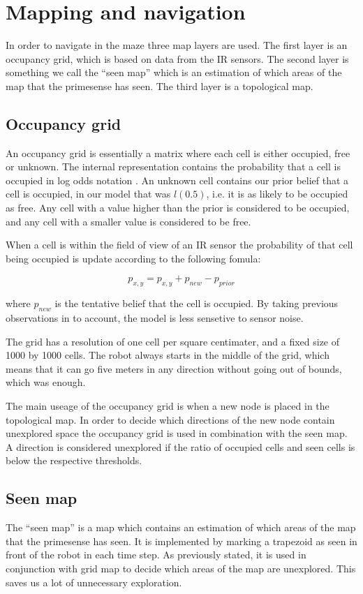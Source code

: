 \section{Mapping and navigation}
In order to navigate in the maze three map layers are used. The first layer is an occupancy grid, which is based on data from the IR sensors. The second layer is something we call the ``seen map'' which is an estimation of which areas of the map that the primesense has seen. The third layer is a topological map.

\subsection{Occupancy grid}
An occupancy grid is essentially a matrix where each cell is either occupied, free or unknown. 
The internal representation contains the probability that a cell is occupied in log odds notation \cite{wiki:Logit}.
An unknown cell contains our prior belief that a cell is occupied, in our model that was $l(0.5)$, i.e. it is as likely to be occupied as free. 
Any cell with a value higher than the prior is considered to be occupied, and any cell with a smaller value is considered to be free.

When a cell is within the field of view of an IR sensor the probability of that cell being occupied is update according to the following fomula:

\begin{equation}
p_{x, y} = p_{x, y} + p_{new} - p_{prior}
\end{equation}

where $p_{new}$ is the tentative belief that the cell is occupied. By taking previous observations in to account, the model is less sensetive to sensor noise. \cite{GridLecture}

The grid has a resolution of one cell per square centimater, and a fixed size of 1000 by 1000 cells. 
The robot always starts in the middle of the grid, which means that it can go five meters in any direction without going out of bounds, which was enough.

The main useage of the occupancy grid is when a new node is placed in the topological map. 
In order to decide which directions of the new node contain unexplored space the occupancy grid is used in combination with the seen map. 
A direction is considered unexplored if the ratio of occupied cells and seen cells is below the respective thresholds.

\subsection{Seen map}
The ``seen map'' is a map which contains an estimation of which areas of the map that the primesense has seen. 
It is implemented by marking a trapezoid as seen in front of the robot in each time step. 
As previously stated, it is used in conjunction with grid map to decide which areas of the map are unexplored. 
This saves us a lot of unnecessary exploration.

